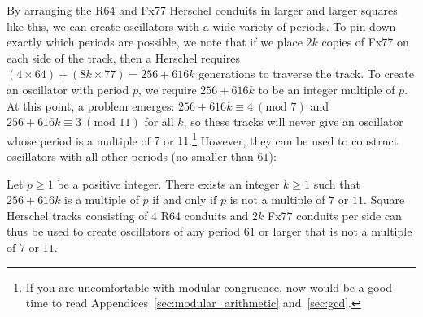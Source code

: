 
By arranging the R64 and Fx77 Herschel conduits in larger and larger squares like this, we can create oscillators with a wide variety of periods. To pin down exactly which periods are possible, we note that if we place $2k$ copies of Fx77 on each side of the track, then a Herschel requires $(4 \times 64) + (8k \times 77) = 256 + 616k$ generations to traverse the track. To create an oscillator with period $p$, we require $256 + 616k$ to be an integer multiple of $p$. At this point, a problem emerges: $256 + 616k \equiv 4 \ (\text{mod } 7)$ and $256 + 616k \equiv 3 \ (\text{mod } 11)$ for all $k$, so these tracks will never give an oscillator whose period is a multiple of $7$ or $11$.\footnote{If you are uncomfortable with modular congruence, now would be a good time to read Appendices~\ref{sec:modular_arithmetic} and~\ref{sec:gcd}.} However, they can be used to construct oscillators with all other periods (no smaller than $61$):

\begin{theorem}\label{thm:Herschel_7_11}
	Let $p \geq 1$ be a positive integer. There exists an integer $k \geq 1$ such that $256 + 616k$ is a multiple of $p$ if and only if $p$ is not a multiple of $7$ or $11$. Square Herschel tracks consisting of $4$ R64 conduits and $2k$ Fx77 conduits per side can thus be used to create oscillators of any period $61$ or larger that is not a multiple of $7$ or $11$.
\end{theorem}

